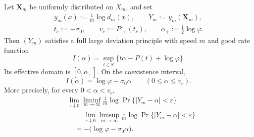 \begin{theorem}
\label{thm:full-fiber-ldp}
Let \(\mathbf X_m\) be uniformly distributed on \(X_m\), and set
\[
 \begin{gathered}
 y_m(x):=\frac1m\log d_m(x),\qquad
 Y_m:=y_m(\mathbf X_m),\\
 t_c:=-\sigma_0,\qquad v_c:=P'_+(t_c),
 \qquad \alpha_+:=\frac12\log\varphi.
 \end{gathered}
\]
Then \((Y_m)\) satisfies a full large deviation principle with speed \(m\)
and good rate function
\begin{equation}
 I(\alpha)=\sup_{t\in\mathbb R}
 \{t\alpha-P(t)+\log\varphi\}.
 \label{eq:full-fiber-ldp-rate}
\end{equation}
Its effective domain is \([0,\alpha_+]\).  On the coexistence interval,
\begin{equation}
 I(\alpha)=\log\varphi-\sigma_0\alpha
 \qquad(0\le\alpha\le v_c).
 \label{eq:frozen-affine-rate}
\end{equation}
More precisely, for every \(0<\alpha<v_c\),
\begin{equation}
 \begin{aligned}
 &\lim_{\varepsilon\downarrow0}\liminf_{m\to\infty}
 \frac1m\log\Pr\{|Y_m-\alpha|<\varepsilon\}\\
 &\quad=
 \lim_{\varepsilon\downarrow0}\limsup_{m\to\infty}
 \frac1m\log\Pr\{|Y_m-\alpha|<\varepsilon\}\\
 &\quad=-\bigl(\log\varphi-\sigma_0\alpha\bigr).
 \end{aligned}
 \label{eq:frozen-local-large-deviation}
\end{equation}
\end{theorem}

